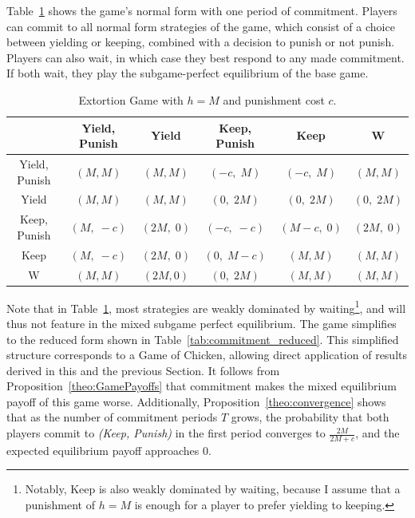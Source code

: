 \documentclass[main.tex]{subfiles}
\begin{document}
Table~\ref{tab:commitment_wait} shows the game's normal form with one period of commitment. Players can commit to all normal form strategies of the game, which consist of a choice between yielding or keeping, combined with a decision to punish or not punish. Players can also wait, in which case they best respond to any made commitment. If both wait, they play the subgame-perfect equilibrium of the base game.
\begin{table}[h!]
    \centering
    \renewcommand{\arraystretch}{0.7}
    \begin{tabular}{c|ccccc}
                    & Yield, Punish & Yield & Keep, Punish & Keep & W \\ \hline
        Yield, Punish   & $(M,M)$         & $(M,M)$         & $(-c,\;M)$       & $(-c,\;M)$ & $(M,M)$ \\[2pt]
        Yield           & $(M,M)$         & $(M,M)$         & $(0,\;2M)$       & $(0,\;2M)$ & $(0,\;2M)$ \\[2pt]
        Keep, Punish    & $(M,\;-c)$       & $(2M,\;0)$       & $(-c,\;-c)$      & $(M-c,\;0)$  & $(2M,\;0)$ \\[2pt]
        Keep            & $(M,\;-c)$       & $(2M,\;0)$       & $(0,\;M-c)$      & $(M,M)$     & $(M,M)$ \\[2pt]
        W               & $(M,M)$         & $(2M,0)$        & $(0,\;2M)$       & $(M,M)$     & $(M,M)$
    \end{tabular}
    \caption{Extortion Game with \( h = M \) and punishment cost \( c \).}
    \label{tab:commitment_wait}
\end{table}
\newline
Note that in Table~\ref{tab:commitment_wait}, most strategies are weakly dominated by waiting\footnote{Notably, Keep is also weakly dominated by waiting, because I assume that a punishment of $h=M$ is enough for a player to prefer yielding to keeping.}, and will thus not feature in the mixed subgame perfect equilibrium. The game simplifies to the reduced form shown in Table~\ref{tab:commitment_reduced}. This simplified structure corresponds to a Game of Chicken, allowing direct application of results derived in this and the previous Section. It follows from Proposition~\ref{theo:GamePayoffs} that commitment makes the mixed equilibrium payoff of this game worse.  
Additionally, Proposition~\ref{theo:convergence} shows that as the number of commitment periods $T$ grows, the probability that both players commit to \textit{(Keep, Punish)} in the first period converges to $\frac{2M}{2M+c}$, and the expected equilibrium payoff approaches $0$.
\end{document}
